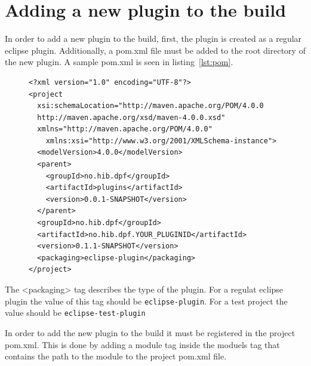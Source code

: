 \documentclass[a4paper]{article}
\begin{document}
\section{Adding a new plugin to the build}
\label{sec:plugins}

In order to add a new plugin to the build, first, the plugin is created as a regular eclipse plugin. Additionally, a pom.xml file must be added to the root directory
of the new plugin. A sample pom.xml is seen in listing~\ref{lst:pom}.

\begin{figure}
\begin{lstlisting}[caption={Sample pom.xml}]
<?xml version="1.0" encoding="UTF-8"?>
<project 
  xsi:schemaLocation="http://maven.apache.org/POM/4.0.0 
  http://maven.apache.org/xsd/maven-4.0.0.xsd" 
  xmlns="http://maven.apache.org/POM/4.0.0"
    xmlns:xsi="http://www.w3.org/2001/XMLSchema-instance">
  <modelVersion>4.0.0</modelVersion>
  <parent>
    <groupId>no.hib.dpf</groupId>
    <artifactId>plugins</artifactId>
    <version>0.0.1-SNAPSHOT</version>
  </parent>
  <groupId>no.hib.dpf</groupId>
  <artifactId>no.hib.dpf.YOUR_PLUGINID</artifactId>
  <version>0.1.1-SNAPSHOT</version>
  <packaging>eclipse-plugin</packaging>
</project>
\end{lstlisting}
\end{figure}

The <packaging> tag describes the type of the plugin. For a regulat eclipse plugin the value of this tag should be \texttt{eclipse-plugin}. For a test project
the value should be \texttt{eclipse-test-plugin}


In order to add the new plugin to the build it must be registered in the project pom.xml. This is done by adding a module tag inside the moduels tag that contains
the path to the module to  the project pom.xml file.

\end{document}
